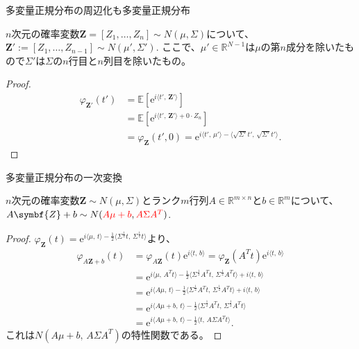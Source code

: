 \documentclass[lualatex,handout]{beamer}
\newcommand{\mycolor}[2]{%
  \begingroup
  \colorlet{currentcolor}{.}%
  \color{#1}#2%
  \color{currentcolor}%
  \endgroup
}
\newcommand{\emm}[1]{\mycolor{red}{#1}}
\newcommand{\expt}[1]{\mathbb{E}\left[#1\right]}
\theoremstyle{definition}
\begin{document}
\begin{frame}{多変量正規分布の周辺化も多変量正規分布}
\begin{lemma}
$n$次元の確率変数$\symbf{Z}=[Z_1,\dotsc, Z_n]\sim N(\mu, \Sigma)$について、
$\symbf{Z}':=[Z_1,\dotsc, Z_{n-1}]\sim N(\mu', \Sigma')$.
ここで、$\mu'\in\mathbb{R}^{N-1}$は$\mu$の第$n$成分を除いたもので$\Sigma'$は$\Sigma$の$n$行目と$n$列目を除いたもの。
\end{lemma}
\begin{proof}
\begin{align*}
\varphi_{\symbf{Z}'}(t') &= \expt{\mathrm{e}^{i\langle t',\,\symbf{Z}'\rangle}}\\
&=\expt{\mathrm{e}^{i\langle t',\, \symbf{Z}'\rangle + 0\cdot Z_n}}\\
&=\varphi_{\symbf{Z}}(t',0) = \mathrm{e}^{i\langle t',\,\mu'\rangle - \langle \sqrt{\Sigma'}t',\,\sqrt{\Sigma'}t'\rangle}.
\end{align*}
\end{proof}
\end{frame}

\begin{frame}{多変量正規分布の一次変換}
\small
\begin{lemma}
$n$次元の確率変数$\symbf{Z}\sim N(\mu, \Sigma)$とランク$m$行列$A\in\mathbb{R}^{m\times n}$と$b\in\mathbb{R}^m$について、
$A\symbf{Z}+b\sim N(\emm{A\mu+b}, \emm{A\Sigma A^T})$.
\end{lemma}
\begin{proof}
$\varphi_{\symbf{Z}}(t) = \mathrm{e}^{i\langle \mu,\, t\rangle - \frac12\langle \Sigma^\frac12t,\,\Sigma^\frac12t\rangle}$より、
\begin{align*}
\varphi_{A{\symbf{Z}}+b}(t) &= \varphi_{A{\symbf{Z}}}(t)\mathrm{e}^{i\langle t,\,b\rangle} = \varphi_{\symbf{Z}}(A^Tt)\mathrm{e}^{i\langle t,\,b\rangle}\\
&= \mathrm{e}^{i\langle \mu,\, A^T t\rangle - \frac12\langle \Sigma^\frac12A^T t,\,\Sigma^\frac12A^T t\rangle + i\langle t,\,b\rangle}\\
&= \mathrm{e}^{i\langle A\mu,\, t\rangle - \frac12\langle \Sigma^\frac12A^T t,\,\Sigma^\frac12A^T t\rangle+ i\langle t,\,b\rangle}\\
&= \mathrm{e}^{i\langle A\mu + b,\, t\rangle - \frac12\langle \Sigma^\frac12A^T t,\,\Sigma^\frac12A^T t\rangle}\\
&= \mathrm{e}^{i\langle A\mu + b,\, t\rangle - \frac12\langle t,\,A \Sigma A^T t\rangle}.
\end{align*}
これは$N(A\mu+b,\, A\Sigma A^T)$の特性関数である。
\end{proof}
\end{frame}
\end{document}
